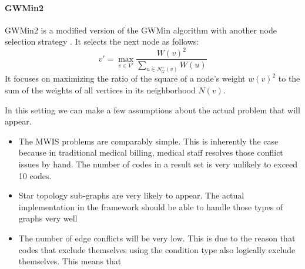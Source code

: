 \paragraph{GWMin2}
GWMin2 is a modified version of the GWMin algorithm with another node selection strategy \cite{SAKAI2003313}.
It selects the next node as follows:
\[
    v' = \max_{v \in V'} \frac{W(v)^2}{\sum_{u \in N_G^+(v)} W(u)}
\]
It focuses on maximizing the ratio of the square of a node's weight $w\left(v\right)^2$ to the sum of the weights of all vertices in its neighborhood $N\left(v\right)$.




In this setting we can make a few assumptions about the actual problem that will appear.
\begin{itemize}
    \item The MWIS problems are comparably simple.
    This is inherently the case because in traditional medical billing, medical staff resolves those conflict issues by hand.
    The number of codes in a result set is very unlikely to exceed 10 codes.
    \item Star topology sub-graphs are very likely to appear.
    The actual implementation in the framework should be able to handle those types of graphs very well
    \item The number of edge conflicts will be very low.
    This is due to the reason that codes that exclude themselves using the  condition type also logically exclude themselves.
    This means that
\end{itemize}



